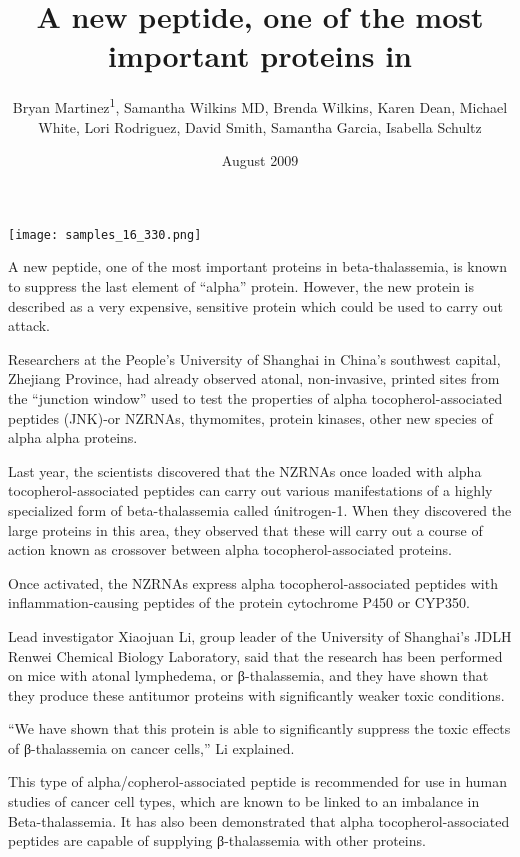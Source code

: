 \documentclass{article}
\title{A new peptide, one of the most important proteins in}
\author{Bryan Martinez\textsuperscript{1},  Samantha Wilkins MD,  Brenda Wilkins,  Karen Dean,  Michael White,  Lori Rodriguez,  David Smith,  Samantha Garcia,  Isabella Schultz}
\affil{\textsuperscript{1}Hospital Son Dureta and Instituto Universitario de Investigacion en Ciencias de la Salud}
\date{August 2009}
\begin{document}
\maketitle

\begin{center}
\begin{minipage}{0.75\linewidth}
\texttt{[image: samples\_16\_330.png]}
\end{minipage}
\end{center}

A new peptide, one of the most important proteins in beta-thalassemia, is known to suppress the last element of “alpha” protein. However, the new protein is described as a very expensive, sensitive protein which could be used to carry out attack.

Researchers at the People’s University of Shanghai in China’s southwest capital, Zhejiang Province, had already observed atonal, non-invasive, printed sites from the “junction window” used to test the properties of alpha tocopherol-associated peptides (JNK)-or NZRNAs, thymomites, protein kinases, other new species of alpha alpha proteins.

Last year, the scientists discovered that the NZRNAs once loaded with alpha tocopherol-associated peptides can carry out various manifestations of a highly specialized form of beta-thalassemia called únitrogen-1. When they discovered the large proteins in this area, they observed that these will carry out a course of action known as crossover between alpha tocopherol-associated proteins.

Once activated, the NZRNAs express alpha tocopherol-associated peptides with inflammation-causing peptides of the protein cytochrome P450 or CYP350.

Lead investigator Xiaojuan Li, group leader of the University of Shanghai’s JDLH Renwei Chemical Biology Laboratory, said that the research has been performed on mice with atonal lymphedema, or β-thalassemia, and they have shown that they produce these antitumor proteins with significantly weaker toxic conditions.

“We have shown that this protein is able to significantly suppress the toxic effects of β-thalassemia on cancer cells,” Li explained.

This type of alpha/copherol-associated peptide is recommended for use in human studies of cancer cell types, which are known to be linked to an imbalance in Beta-thalassemia. It has also been demonstrated that alpha tocopherol-associated peptides are capable of supplying β-thalassemia with other proteins.
\end{document}
